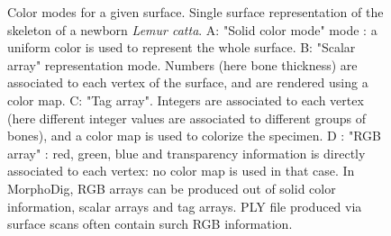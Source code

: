 \begin{figure}
	\caption{Color modes for a given surface. Single surface representation of the skeleton of a newborn \textit{Lemur catta}. A: "Solid color mode" mode : a uniform color is used to represent the whole surface. B: "Scalar array" representation mode. Numbers (here bone thickness) are associated to each vertex of the surface, and are rendered using a color map. C: "Tag array". Integers are associated to each vertex  (here different integer values are associated to different groups of bones), and a color map is used  to colorize the specimen. D : "RGB array" : red, green, blue and transparency information is directly associated to each vertex: no color map is used in that case. In MorphoDig, RGB arrays can be produced out of solid color information, scalar arrays and tag arrays. PLY file produced via surface scans often contain surch RGB information.}
\label{4color_modes}
 
\end{figure}